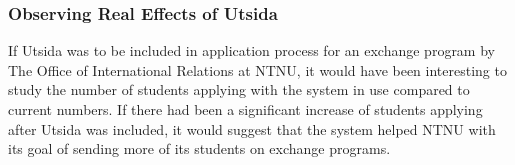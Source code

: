 \subsubsection{Observing Real Effects of Utsida}
If Utsida was to be included in application process for an exchange program by The Office of International Relations at NTNU, it would have been interesting to study the number of students applying with the system in use compared to current numbers. If there had been a significant increase of students applying after Utsida was included, it would suggest that the system helped NTNU with its goal of sending more of its students on exchange programs.



\cleardoublepage